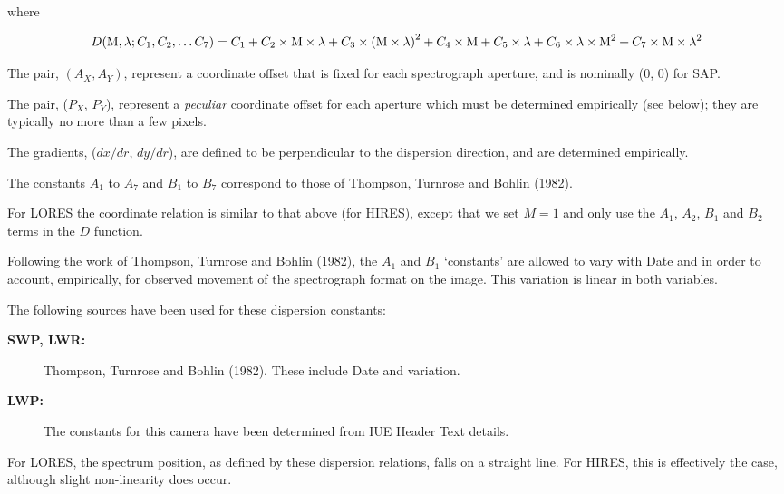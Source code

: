 where

\begin{displaymath}
D({\rm M}, \lambda; C_{1}, C_{2},\ldots C_{7}) =
C_{1} +
C_{2}\times {\rm M} \times \lambda +
C_{3}\times {({\rm M} \times \lambda)}^{2} +
C_{4}\times {\rm M} +
C_{5}\times \lambda +
C_{6}\times \lambda \times {\rm M}^{2} +
C_{7}\times {\rm M} \times \lambda^{2}
\end{displaymath}

The pair, $(A_{X}, A_{Y})$, represent a coordinate offset that is fixed for each
spectrograph aperture, and is nominally (0, 0) for SAP\@.

The pair, ($P_{X}$, $P_{Y}$), represent a {\em peculiar} coordinate offset for
each aperture which must be determined empirically (see below); they are
typically no more than a few pixels.

The gradients, ($dx/dr$, $dy/dr$), are defined to be perpendicular to the
dispersion direction, and are determined empirically.

The constants $A_{1}$ to $A_{7}$ and $B_{1}$ to $B_{7}$ correspond to those of
Thompson, Turnrose and Bohlin (1982)\@.

For LORES the coordinate relation is similar to that above (for HIRES),
except that we set $M=1$ and only use the $A_{1}$, $A_{2}$, $B_{1}$ and $B_{2}$
terms in the $D$ function.

Following the work of Thompson, Turnrose and Bohlin (1982), the $A_{1}$ and
$B_{1}$ `constants' are allowed to vary with Date and
 in order to
account, empirically, for observed movement of the spectrograph format on the
image.  This variation is linear in both variables.

The following sources have been used for these dispersion constants:

\begin{description}

\item [{\bf SWP, LWR:}]
      Thompson, Turnrose and Bohlin (1982)\@.  These include Date
      and  variation.

\item [{\bf LWP:}]
      The constants for this camera have been determined from IUE
      Header Text details.

\end{description}

For LORES, the spectrum position, as defined by these dispersion
relations, falls on a straight line.  For HIRES, this is effectively the
case, although slight non-linearity does occur.


